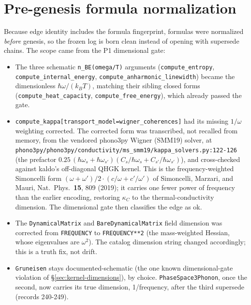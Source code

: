 \documentclass[11pt,a4paper]{article}
\begin{document}
\section{Pre-genesis formula normalization}
\label{sec:kernel-normalization}

Because edge identity includes the formula fingerprint, formulas were normalized
\emph{before} genesis, so the frozen log is born clean instead of opening with
supersede chains. The scope came from the P1 dimensional gate:
\begin{itemize}[leftmargin=2em, itemsep=0.25em]
  \item The three schematic \texttt{n\_BE(omega/T)} arguments
        (\texttt{compute\_entropy}, \texttt{compute\_internal\_energy},
        \texttt{compute\_anharmonic\_linewidth}) became the dimensionless
        $\hbar\omega/(k_B T)$, matching their sibling closed forms
        (\texttt{compute\_heat\_capacity}, \texttt{compute\_free\_energy}), which
        already passed the gate.
  \item \texttt{compute\_kappa[transport\_model=wigner\_coherences]} had its
        missing $1/\omega$ weighting corrected. The corrected form was
        transcribed, not recalled from memory, from the vendored phono3py Wigner
        (SMM19) solver, at
        \texttt{phono3py/phono3py/conductivity/ms\_smm19/kappa\_solvers.py:122-126}
        (the prefactor $0.25\,(\hbar\omega_s + \hbar\omega_{s'})(C_s/\hbar\omega_s
        + C_{s'}/\hbar\omega_{s'})$), and cross-checked against kaldo's
        off-diagonal QHGK kernel. This is the frequency-weighted Simoncelli form
        $(\omega + \omega')/2\cdot(c/\omega + c'/\omega')$ of Simoncelli, Marzari,
        and Mauri, Nat.\ Phys.\ \textbf{15}, 809 (2019); it carries one fewer
        power of frequency than the earlier encoding, restoring $\kappa_C$ to the
        thermal-conductivity dimension. The dimensional gate then classifies the
        edge as ok.
  \item The \texttt{DynamicalMatrix} and \texttt{BareDynamicalMatrix} field
        dimension was corrected from \texttt{FREQUENCY} to \texttt{FREQUENCY**2}
        (the mass-weighted Hessian, whose eigenvalues are $\omega^2$). The catalog
        dimension string changed accordingly; this is a truth fix, not drift.
  \item \texttt{Gruneisen} stays documented-schematic (the one known
        dimensional-gate violation of \S\ref{sec:kernel-dimensions}), by
        choice. \texttt{PhaseSpace3Phonon}, once the second, now carries its
        true dimension, 1/frequency, after the third supersede (records
        240-249).
\end{itemize}
\end{document}
